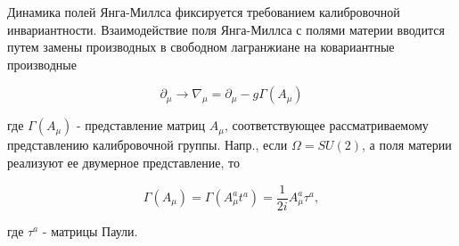 \documentclass[10pt]{article}
\begin{document}
Динамика полей Янга-Миллса фиксируется требованием калибровочной инвариантности. Взаимодействие поля Янга-Миллса с полями материи вводится путем замены производных в свободном лагранжиане на ковариантные производные



\[

\partial_{\mu} \rightarrow \nabla_{\mu}=\partial_{\mu}-g \Gamma\left(A_{\mu}\right)

\]



где $\Gamma\left(A_{\mu}\right)$ - представление матриц $A_{\mu}$, соответствующее рассматриваемому представлению калибровочной группы. Напр., если $\Omega=S U(2)$, а поля материи реализуют ее двумерное представление, то



\[

\Gamma\left(A_{\mu}\right)=\Gamma\left(A_{\mu}^{a} t^{a}\right)=\frac{1}{2 i} A_{\mu}^{a} \tau^{a},

\]



где $\tau^{a}$ - матрицы Паули.
\end{document}
